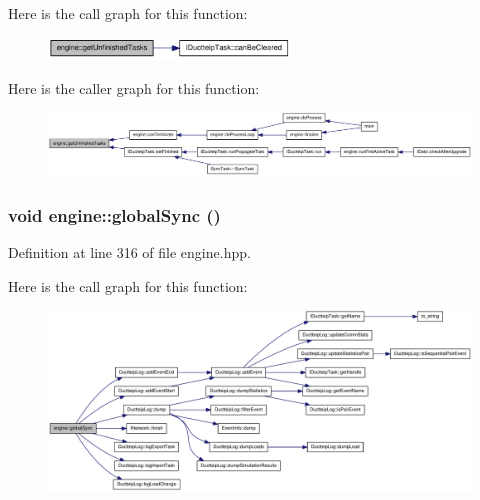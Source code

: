 Here is the call graph for this function:\nopagebreak
\begin{figure}[H]
\begin{center}
\leavevmode
\includegraphics[width=182pt]{classengine_abe97f2997638c312c34128fd581472dd_cgraph}
\end{center}
\end{figure}


Here is the caller graph for this function:\nopagebreak
\begin{figure}[H]
\begin{center}
\leavevmode
\includegraphics[width=420pt]{classengine_abe97f2997638c312c34128fd581472dd_icgraph}
\end{center}
\end{figure}
\hypertarget{classengine_a9bc79f83757312b0ff06a7cfbe0c1c65}{
\subsubsection[{globalSync}]{\setlength{\rightskip}{0pt plus 5cm}void engine::globalSync ()}}
\label{classengine_a9bc79f83757312b0ff06a7cfbe0c1c65}


Definition at line 316 of file engine.hpp.

Here is the call graph for this function:\nopagebreak
\begin{figure}[H]
\begin{center}
\leavevmode
\includegraphics[width=420pt]{classengine_a9bc79f83757312b0ff06a7cfbe0c1c65_cgraph}
\end{center}
\end{figure}


